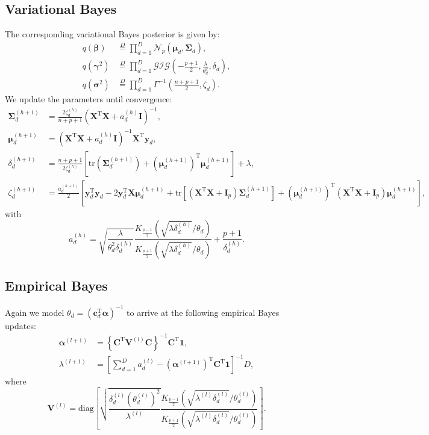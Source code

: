 \documentclass[a4paper,hidelinks]{article}\usepackage[]{graphicx}\usepackage[]{color}
\newcommand{\y}{\mathbf{y}}
\newcommand{\X}{\mathbf{X}}
\newcommand{\I}{\mathbf{I}}
\newcommand{\Vm}{\mathbf{V}}
\newcommand{\0}{\bm{0}}
\newcommand{\tr}{^{\text{T}}}
\newcommand{\diag}{\text{diag}}
\newcommand{\trace}{\text{tr}}
\renewcommand{\(}{\left(}
\renewcommand{\)}{\right)}
\renewcommand{\[}{\left[}
\renewcommand{\]}{\right]}
\begin{document}
\begin{appendix}
		\subsection{Variational Bayes}
		The corresponding variational Bayes posterior is given by:
		\begin{align*}
		q(\bm{\beta}) & \overset{D}{=} \prod_{d=1}^D \mathcal{N}_p (\bm{\mu}_d, \bm{\Sigma}_d), \\
		q(\bm{\gamma}^2) & \overset{D}{=} \prod_{d=1}^D \mathcal{GIG}\(-\frac{p+1}{2}, \frac{\lambda}{\theta_d^2}, \delta_d\), \\
		q(\bm{\sigma}^2) & \overset{D}{=} \prod_{d=1}^D \Gamma^{-1} \(\frac{n + p + 1}{2}, \zeta_d\).
		\end{align*}
		We update the parameters until convergence:
		\begin{align*}
		\bm{\Sigma}_d^{(h+1)} & = \frac{2 \zeta_d^{(h)}}{n+p+1} (\X \tr \X + a_d^{(h)} \I)^{-1}, \\
		\bm{\mu}_d^{(h+1)} & = (\X \tr \X + a_d^{(h)} \I)^{-1} \X \tr \y_d, \\
		\delta_d^{(h+1)} & = \frac{n+p+1}{2 \zeta_d^{(h)}} [\trace(\bm{\Sigma}_d^{(h+1)}) + (\bm{\mu}_d^{(h+1)}) \tr \bm{\mu}_d^{(h+1)}] + \lambda, \\ \zeta_d^{(h+1)} & = \frac{a_d^{(h+1)}}{2} \[\mathbf{y}_d \tr \mathbf{y}_d -2 \mathbf{y}_d \tr \X \bm{\mu}_d^{(h+1)} + \trace [ (\X \tr \X + \I_p) \bm{\Sigma}_d^{(h+1)}] + (\bm{\mu}_d^{(h+1)}) \tr (\X \tr \X + \I_p)\bm{\mu}_d^{(h+1)}\],
		\end{align*}
		with
		$$
		a_d^{(h)} = \sqrt{\frac{\lambda}{\theta_d^2 \delta_d^{(h)}}} \frac{K_{\frac{p - 1}{2}}\(\sqrt{\lambda \delta_d^{(h)}} /\theta_d \)}{K_{\frac{p + 1}{2}}\(\sqrt{\lambda \delta_d^{(h)}} /\theta_d \)} + \frac{p+1}{\delta_d^{(h)}}.
		$$
		
		\subsection{Empirical Bayes}
		Again we model $\theta_d = (\mathbf{c}_d \tr \bm{\alpha})^{-1}$ to arrive at the following empirical Bayes updates:
		\begin{align*}
		\bm{\alpha}^{(l+1)} & = \left\{ \mathbf{C} \tr \Vm^{(l)} \mathbf{C} \right\}^{-1} \mathbf{C} \tr \mathbf{1}, \\
		\lambda^{(l+1)} & = \[ \sum_{d=1}^D a_d^{(l)} - (\bm{\alpha}^{(l+1)}) \tr \mathbf{C} \tr \mathbf{1} \]^{-1} D,
		\end{align*}
		where 
		$$
		\Vm^{(l)} = \diag \[ \sqrt{\frac{\delta_d^{(l)}(\theta_d^{(l)})^2}{\lambda^{(l)}}} \frac{K_{\frac{p - 1}{2}} \( \sqrt{\lambda^{(l)} \delta_d^{(l)}}/\theta^{(l)}_d \)}{K_{\frac{p + 1}{2}} \( \sqrt{\lambda^{(l)} \delta_d^{(l)}}/\theta^{(l)}_d \)} \].
		$$
		

\end{appendix}
\end{document}
